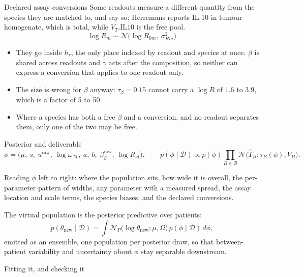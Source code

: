 \documentclass[10pt,aspectratio=169]{beamer}
\newcommand{\Ncal}{\mathcal{N}}
\newcommand{\Mset}{\mathcal{M}}
\newcommand{\Dset}{\mathcal{D}}
\newcommand{\Bset}{\mathcal{B}}
\begin{document}
\begin{frame}[t]{Declared assay conversions}
  Some readouts measure a different quantity from the species they are matched
  to, and say so: Herremans reports IL-10 in tumour homogenate, which is total,
  while $V_T.\mathrm{IL10}$ is the free pool.
  \[ \log R_m \sim \Ncal\big(\log R_{0m},\ \sigma_{Rm}^2\big) \]
  \begin{itemize}
    \item They go inside $h_r$, the only place indexed by readout and species at
      once. $\beta$ is shared across readouts and $\gamma$ acts after the
      composition, so neither can express a conversion that applies to one
      readout only.
    \item The size is wrong for $\beta$ anyway: $\tau_\beta=0.15$ cannot carry a
      $\log R$ of $1.6$ to $3.9$, which is a factor of 5 to 50.
    \item Where a species has both a free $\beta$ and a conversion, and no
      readout separates them, only one of the two may be free.
  \end{itemize}
\end{frame}

\begin{frame}[t]{Posterior and deliverable}
  \begingroup\small
  \[
    \phi = \big(\mu,\ s,\ u^{\text{raw}},\ \log\omega_{\Mset},\ a,\ b,\
      \beta^{\text{raw}}_{\mathcal{S}},\ \log R_{\mathcal{A}}\big),
    \qquad
    p(\phi\mid\Dset) \propto p(\phi)\prod_{B\in\Bset}
      \Ncal\big(\widehat T_B;\tau_B(\phi),V_B\big).
  \]
  \endgroup
  \vspace{-0.3em}
  {\small Reading $\phi$ left to right: where the population sits, how wide it is
   overall, the per-parameter pattern of widths, any parameter with a measured
   spread, the assay location and scale terms, the species biases, and the
   declared conversions.\par}
  \vfill
  The virtual population is the posterior predictive over patients:
  \[
    p(\theta_{\text{new}}\mid\Dset) = \int \Ncal_P\big(\log\theta_{\text{new}};\mu,\Omega\big)\,
      p(\phi\mid\Dset)\,d\phi ,
  \]
  emitted as an \alert{ensemble}, one population per posterior draw, so that
  between-patient variability and uncertainty about $\phi$ stay separable
  downstream.
\end{frame}

\begin{frame}[standout]
  Fitting it, and checking it
\end{frame}
\end{document}
